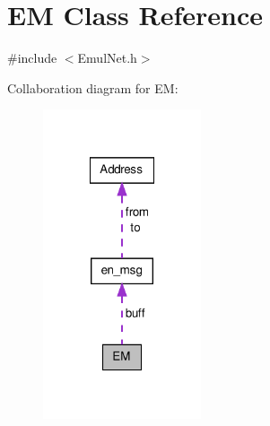 \hypertarget{class_e_m}{\section{\-E\-M \-Class \-Reference}
\label{db/dfc/class_e_m}
}


{\ttfamily \#include $<$\-Emul\-Net.\-h$>$}



\-Collaboration diagram for \-E\-M\-:
\nopagebreak
\begin{figure}[H]
\begin{center}
\leavevmode
\includegraphics[width=132pt]{d2/d19/class_e_m__coll__graph}
\end{center}
\end{figure}
